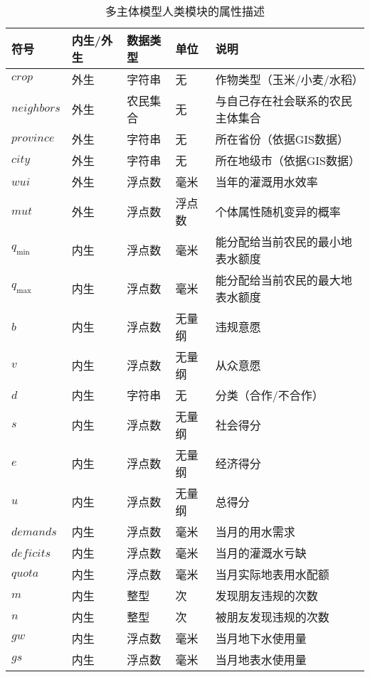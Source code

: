 \begin{table}[htbp]
      \centering
      \caption{多主体模型人类模块的属性描述}
        \begin{tabularx}{\textwidth}{LLLLp{6cm}}
        \toprule
        符号    & 内生/外生 & 数据类型  & 单位    & 说明 \\
        \midrule
        $crop$ & 外生    & 字符串   & 无     & 作物类型（玉米/小麦/水稻） \\
        $neighbors$ & 外生    & 农民集合  & 无     & 与自己存在社会联系的农民主体集合 \\
        $province$ & 外生    & 字符串   & 无     & 所在省份（依据GIS数据） \\
        $city$ & 外生    & 字符串   & 无     & 所在地级市（依据GIS数据） \\
        $wui$ & 外生    & 浮点数   & 毫米    & 当年的灌溉用水效率 \\
        $mut$ & 外生    & 浮点数   & 浮点数   & 个体属性随机变异的概率 \\
        $q_{\min}$ & 内生    & 浮点数   & 毫米    & 能分配给当前农民的最小地表水额度 \\
        $q_{\max}$ & 内生    & 浮点数   & 毫米    & 能分配给当前农民的最大地表水额度 \\
        $b$   & 内生    & 浮点数   & 无量纲   & 违规意愿 \\
        $v$   & 内生    & 浮点数   & 无量纲   & 从众意愿 \\
        $d$   & 内生    & 字符串   & 无     & 分类（合作/不合作） \\
        $s$   & 内生    & 浮点数   & 无量纲   & 社会得分 \\
        $e$   & 内生    & 浮点数   & 无量纲   & 经济得分 \\
        $u$   & 内生    & 浮点数   & 无量纲   & 总得分 \\
        $demands$ & 内生    & 浮点数   & 毫米    & 当月的用水需求 \\
        $deficits$ & 内生    & 浮点数   & 毫米    & 当月的灌溉水亏缺 \\
        $quota$ & 内生    & 浮点数   & 毫米    & 当月实际地表用水配额 \\
        $m$   & 内生    & 整型    & 次     & 发现朋友违规的次数 \\
        $n$   & 内生    & 整型    & 次     & 被朋友发现违规的次数 \\
        $gw$  & 内生    & 浮点数   & 毫米    & 当月地下水使用量 \\
        $gs$  & 内生    & 浮点数   & 毫米    & 当月地表水使用量 \\
        \bottomrule
        \end{tabularx}%
      \label{ch6:tab:visa2.hum}%
    \end{table}%
    